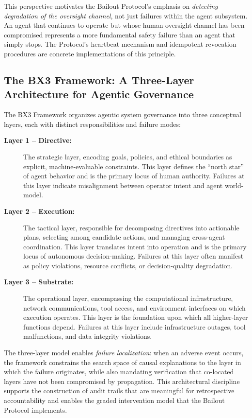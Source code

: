 This perspective motivates the Bailout Protocol's emphasis on \emph{detecting degradation of the oversight channel}, not just failures within the agent subsystem. An agent that continues to operate but whose human oversight channel has been compromised represents a more fundamental safety failure than an agent that simply stops. The Protocol's heartbeat mechanism and idempotent revocation procedures are concrete implementations of this principle.

\subsection{The BX3 Framework: A Three-Layer Architecture for Agentic Governance}

The BX3 Framework organizes agentic system governance into three conceptual layers, each with distinct responsibilities and failure modes:

\begin{description}
\item[\textbf{Layer 1 -- Directive:}] The strategic layer, encoding goals, policies, and ethical boundaries as explicit, machine-evaluable constraints. This layer defines the ``north star'' of agent behavior and is the primary locus of human authority. Failures at this layer indicate misalignment between operator intent and agent world-model.
\item[\textbf{Layer 2 -- Execution:}] The tactical layer, responsible for decomposing directives into actionable plans, selecting among candidate actions, and managing cross-agent coordination. This layer translates intent into operation and is the primary locus of autonomous decision-making. Failures at this layer often manifest as policy violations, resource conflicts, or decision-quality degradation.
\item[\textbf{Layer 3 -- Substrate:}] The operational layer, encompassing the computational infrastructure, network communications, tool access, and environment interfaces on which execution operates. This layer is the foundation upon which all higher-layer functions depend. Failures at this layer include infrastructure outages, tool malfunctions, and data integrity violations.
\end{description}

The three-layer model enables \emph{failure localization}: when an adverse event occurs, the framework constrains the search space of causal explanations to the layer in which the failure originates, while also mandating verification that co-located layers have not been compromised by propagation. This architectural discipline supports the construction of audit trails that are meaningful for retrospective accountability and enables the graded intervention model that the Bailout Protocol implements.

